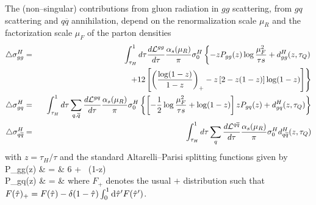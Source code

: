 The (non--singular) contributions from gluon radiation in $gg$ scattering, from
$gq$ scattering and $q \overline{q}$ annihilation, depend on the
renormalization scale $\mu_R$ and the factorization scale $\mu_F$ of the 
parton densities
\begin{eqnarray}
\triangle \sigma_{gg}^H & = &
       \int_{\tau_H}^1 d\tau \frac{d{\cal L}^{gg}}{d\tau}
       \frac{\alpha_s (\mu_R) }{\pi} \sigma_0^H
       \left\{-z P_{gg}(z)\log\frac{\mu_F^2}{\tau s}
       +d_{gg}^H (z,\tau_Q) \right.  \nonumber \\
& & \hspace{4cm} \left.
                  +12 \left[\left(\frac{\log(1-z)}{1-z}\right)_{+}
                  -z\left[2-z(1-z)\right]\log(1-z) \right]
       \right\} \nonumber \\
   \triangle\sigma_{gq}^H & = &
       \int_{\tau_H}^1 d\tau \sum_{q,\overline{q}}
       \frac{d{\cal L}^{gq}}{d\tau}
       \frac{\alpha_s (\mu_R) }{\pi} \sigma_0^H
       \left\{ \left[ -\frac{1}{2}\log\frac{\mu_F^2}{\tau s}+\log(1-z)
       \right] z P_{gq}(z) +d_{gq}^H (z,\tau_Q) \right\} \nonumber\\
   \triangle\sigma_{q\overline{q}}^H & = &
       \int_{\tau_H}^1 d\tau \sum_q
           \frac{d{\cal L}^{q\overline{q}}}{d\tau}
       \frac{\alpha_s (\mu_R) }{\pi} \sigma_0^H
       d_{q\overline{q}}^H (z,\tau_Q)
\label{ggNLOreal}
\end{eqnarray}
with $z=\tau_H/\tau$ and the standard Altarelli--Parisi splitting functions
given by
\beq
P_{gg}(z) & = & 6  +  \, \delta(1-z) \non \\
P_{gq}(z) & = &   
\eeq
where $F_+$ denotes the usual $+$ distribution such that  $F(\hat{\tau})_+ = 
F(\hat{\tau}) - \delta (1 - \hat{\tau}) \int_0^1 {\rm d}
\hat{\tau}'F(\hat{\tau}')$.\s

